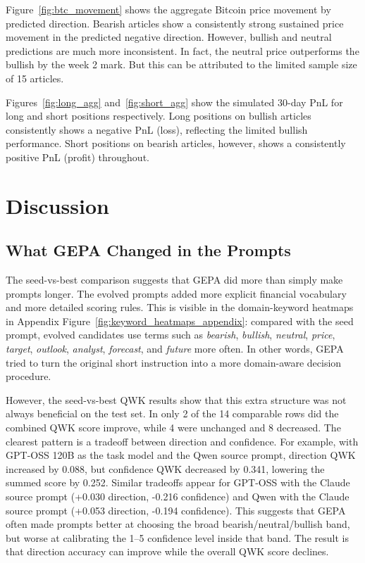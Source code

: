 \documentclass[sigconf,screen]{acmart}
\begin{document}
Figure~\ref{fig:btc_movement} shows the aggregate Bitcoin price movement by predicted direction. Bearish articles show a consistently strong sustained price movement in the predicted negative direction. However, bullish and neutral predictions are much more inconsistent. In fact, the neutral price outperforms the bullish by the week 2 mark. But this can be attributed to the limited sample size of 15 articles. 
 
Figures~\ref{fig:long_agg} and~\ref{fig:short_agg} show the simulated 30-day PnL for long and short positions respectively. Long positions on bullish articles consistently shows a negative PnL (loss), reflecting the limited bullish performance. Short positions on bearish articles, however, shows a consistently positive PnL (profit) throughout.

\section{Discussion}

\subsection{What GEPA Changed in the Prompts}

The seed-vs-best comparison suggests that GEPA did more than simply make
prompts longer. The evolved prompts added more explicit financial vocabulary
and more detailed scoring rules. This is visible in the domain-keyword
heatmaps in Appendix Figure~\ref{fig:keyword_heatmaps_appendix}: compared
with the seed prompt, evolved candidates use terms such as \emph{bearish},
\emph{bullish}, \emph{neutral}, \emph{price}, \emph{target}, \emph{outlook},
\emph{analyst}, \emph{forecast}, and \emph{future} more often. In other
words, GEPA tried to turn the original short instruction into a more
domain-aware decision procedure.

However, the seed-vs-best QWK results show that this extra structure was not
always beneficial on the test set. In only 2 of the 14 comparable rows did the
combined QWK score improve, while 4 were unchanged and 8 decreased. The clearest
pattern is a tradeoff between direction and confidence. For example, with
GPT-OSS 120B as the task model and the Qwen source prompt, direction QWK
increased by 0.088, but confidence QWK decreased by 0.341, lowering the summed
score by 0.252. Similar tradeoffs appear for GPT-OSS with the Claude source
prompt (+0.030 direction, -0.216 confidence) and Qwen with the Claude source
prompt (+0.053 direction, -0.194 confidence). This suggests that GEPA often
made prompts better at choosing the broad bearish/neutral/bullish band, but
worse at calibrating the 1--5 confidence level inside that band. The result is
that direction accuracy can improve while the overall QWK score declines.
\end{document}
